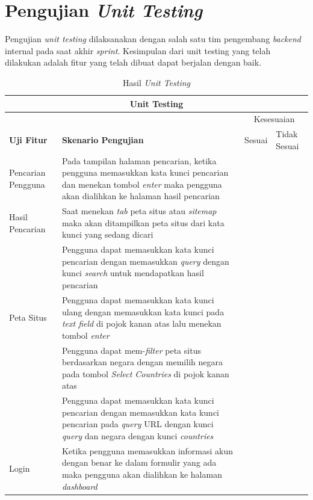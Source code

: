\section{Pengujian \textit{Unit Testing}}

Pengujian \textit{unit testing} dilaksanakan dengan salah satu tim pengembang \textit{backend} internal pada saat akhir \textit{sprint}. Kesimpulan dari unit testing yang telah dilakukan adalah fitur yang telah dibuat dapat berjalan dengan baik.

\begin{longtable}{@{}|p{3cm}|p{6cm}|p{2.5cm}|p{2.5cm}|@{}}
	\caption{Hasil \textit{Unit Testing}} \\
	\hline
	\multicolumn{4}{|c|}{\textbf{Unit Testing}} \\
	\hline
	&&\multicolumn{2}{c|}{Kesesuaian}\\
	\cline{3-4}
	\textbf{Uji Fitur} & \textbf{Skenario Pengujian} & Sesuai & Tidak Sesuai  \\
	\hline
	Pencarian Pengguna & Pada tampilan halaman pencarian, ketika pengguna memasukkan kata kunci pencarian dan menekan tombol \textit{enter} maka pengguna akan dialihkan ke halaman hasil pencarian & \checkmark & \\
	\hline
	Hasil Pencarian & Saat menekan \textit{tab} peta situs atau \textit{sitemap} maka akan ditampilkan peta situs dari kata kunci yang sedang dicari  & \checkmark &\\
	\cline{2-4} 
	& Pengguna dapat memasukkan kata kunci pencarian dengan memasukkan \textit{query} dengan kunci \textit{search} untuk mendapatkan hasil pencarian & \checkmark & \\
	\hline
	Peta Situs & Pengguna dapat memasukkan kata kunci ulang dengan memasukkan kata kunci pada \textit{text field} di pojok kanan atas lalu menekan tombol \textit{enter} & \checkmark & \\
	\cline{2-4}
	& Pengguna dapat mem-\textit{filter} peta situs berdasarkan negara dengan memilih negara pada tombol \textit{Select Countries} di pojok kanan atas  & \checkmark &\\
	\cline{2-4}
	& Pengguna dapat memasukkan kata kunci pencarian dengan memasukkan kata kunci pencarian pada \textit{query} URL dengan kunci \textit{query} dan negara dengan kunci \textit{countries} & \checkmark &\\
	\hline
	Login & Ketika pengguna memasukkan informasi akun dengan benar ke dalam formulir yang ada maka pengguna akan dialihkan ke halaman \textit{dashboard} & \checkmark &\\

\end{longtable}
